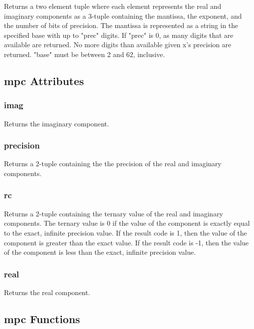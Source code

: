 Returns a two element tuple where each element represents the real and imaginary
components as a 3-tuple containing the mantissa, the exponent, and the number of bits of precision. 
The mantissa is represented as a string in the specified base with up to "prec" digits. If "prec" is 0, as many digits that are available are returned. No more digits than available given x's precision are returned. "base" must be between 2 and 62, inclusive.



\subsection{mpc Attributes}

\subsubsection{imag}

Returns the imaginary component.

\subsubsection{precision}

Returns a 2-tuple containing the the precision of the real and imaginary components.

\subsubsection{rc}

Returns a 2-tuple containing the ternary value of the real and imaginary components. The
ternary value is 0 if the value of the component is exactly equal to the exact, infinite precision
value. If the result code is 1, then the value of the component is greater than the exact value. If
the result code is -1, then the value of the component is less than the exact, infinite precision
value.

\subsubsection{real}

Returns the real component.




\subsection{mpc Functions}

